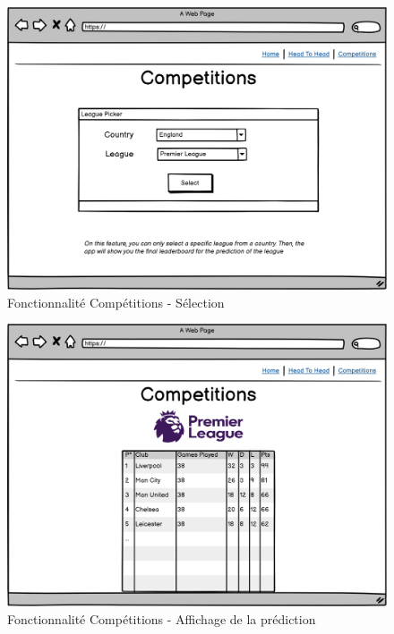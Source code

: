 \documentclass[a4paper,14pt]{extarticle}
\begin{document}
{\begin{figure}[H]
    \centering
    \includegraphics[width=13cm]{../img/maquetteCompetitions_2.png}
    \caption{Fonctionnalité Compétitions - Sélection}
    \label{fig:maquetteCompetitions_2}
\end{figure}

\begin{figure}[H]
    \centering
    \includegraphics[width=13cm]{../img/maquetteCompetitions_3.png}
    \caption{Fonctionnalité Compétitions - Affichage de la prédiction}
    \label{fig:maquetteCompetitions_3}
\end{figure}

}
\end{document}
